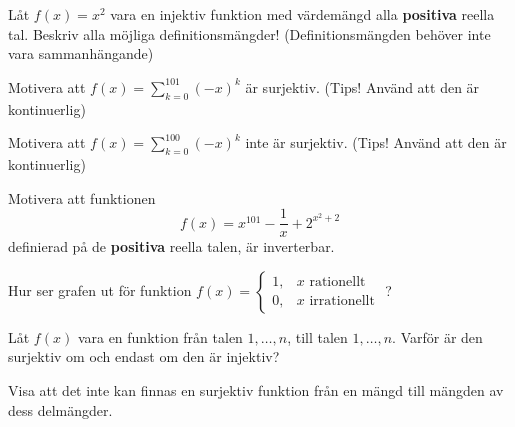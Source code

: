 \begin{problem}
	Låt \(f(x) = x^2\) vara en injektiv funktion med värdemängd alla \textbf{positiva} reella tal. Beskriv alla möjliga definitionsmängder! (Definitionsmängden behöver inte vara sammanhängande)
\end{problem}


\begin{problem}
	Motivera att \(f(x) = \sum_{k=0} ^{101} (-x)^k\) är surjektiv. (Tips! Använd att den är kontinuerlig)
\end{problem}

\begin{problem}
	Motivera att \(f(x) = \sum_{k=0} ^{100} (-x)^k\) inte är surjektiv. (Tips! Använd att den är kontinuerlig)
\end{problem}

\begin{problem}
	Motivera att funktionen
	\[
		f(x) = x^{101} - \frac{1}{x} + 2^{x^2 + 2}
	\]
	definierad på de \textbf{positiva} reella talen, är inverterbar.
\end{problem}

\begin{problem}
	Hur ser grafen ut för funktion \(f(x) = \begin{cases} 1, & x \text{ rationellt} \\ 0, & x \text{ irrationellt} \end{cases} \) ?
\end{problem}

\begin{problem}
	Låt \(f(x)\) vara en funktion från talen \(1,\dots, n\), till talen \(1, \dots ,n\). Varför är den surjektiv om och endast om den är injektiv?
\end{problem}

\begin{problem}
	Visa att det inte kan finnas en surjektiv funktion från en mängd till mängden av dess delmängder.
\end{problem}



